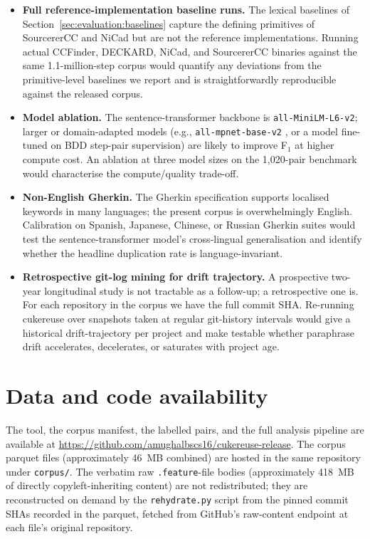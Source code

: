\documentclass[11pt,a4paper]{article}
\begin{document}
\begin{itemize}[leftmargin=2em]
        stable AST support in Python, TypeScript, Ruby, and
        Java makes this tractable for most of the corpus.
  \item \textbf{Full reference-implementation baseline runs.}
        The lexical baselines of
        Section~\ref{sec:evaluation:baselines} capture the
        defining primitives of SourcererCC and NiCad but are not
        the reference implementations. Running actual CCFinder,
        DECKARD, NiCad, and SourcererCC binaries against the same
        1.1-million-step corpus would quantify any deviations
        from the primitive-level baselines we report and is
        straightforwardly reproducible against the released
        corpus.
  \item \textbf{Model ablation.} The sentence-transformer backbone
        is \texttt{all-MiniLM-L6-v2}; larger or domain-adapted
        models (e.g., \texttt{all-mpnet-base-v2}
        \citep{song2020mpnet}, or a model fine-tuned on BDD
        step-pair supervision) are likely to improve F$_1$ at
        higher compute cost. An ablation at three model sizes on
        the 1{,}020-pair benchmark would characterise the
        compute/quality trade-off.
  \item \textbf{Non-English Gherkin.} The Gherkin specification
        supports localised keywords in many languages; the
        present corpus is overwhelmingly English. Calibration
        on Spanish, Japanese, Chinese, or Russian Gherkin
        suites would test the sentence-transformer model's
        cross-lingual generalisation and identify whether the
        headline duplication rate is language-invariant.
  \item \textbf{Retrospective git-log mining for drift trajectory.}
        A prospective two-year longitudinal study is not
        tractable as a follow-up; a retrospective one is. For
        each repository in the corpus we have the full commit
        SHA. Re-running cukereuse over snapshots taken at
        regular git-history intervals would give a historical
        drift-trajectory per project and make testable whether
        paraphrase drift accelerates, decelerates, or saturates
        with project age.
\end{itemize}

\section*{Data and code availability}

The tool, the corpus manifest, the labelled pairs, and the full
analysis pipeline are available at
\url{https://github.com/amughalbscs16/cukereuse-release}. The corpus
parquet files (approximately 46~MB combined) are hosted in the same
repository under \texttt{corpus/}. The verbatim raw
\texttt{.feature}-file bodies (approximately 418~MB of directly
copyleft-inheriting content) are not redistributed; they are
reconstructed on demand by the \texttt{rehydrate.py} script from
the pinned commit SHAs recorded in the parquet, fetched from
GitHub's raw-content endpoint at each file's original repository.
\end{document}
